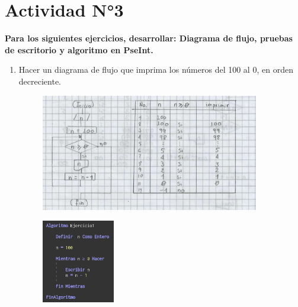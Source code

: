 \documentclass[12pt]{article}
\begin{document}
    
  
    \section*{\centering Actividad N°3}

        \textbf{Para los siguientes ejercicios, desarrollar: Diagrama de flujo, pruebas de escritorio y algoritmo en PseInt.}

        \begin{enumerate}
            \item  Hacer un diagrama de flujo que imprima los números del 100 al 0, en orden decreciente.
            
                \begin{figure}[!h]
                    \centering
                    \includegraphics[width=0.9\textwidth]{Img/DF_ej1.png}
                \end{figure}

                
                \begin{figure}[!h]
                    \centering
                    \includegraphics[width=0.3\textwidth]{Img/Cod_ej1.png}
                \end{figure}


\end{enumerate}
\end{document}
